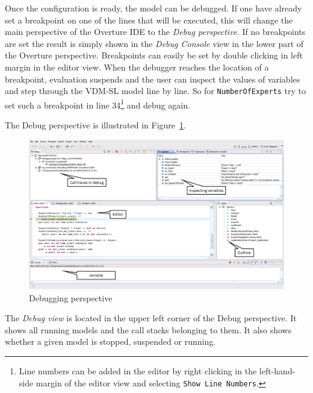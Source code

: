 Once the configuration is ready, the model can be debugged. If one
have already set a breakpoint on one of the lines that will be
executed, this will
change the main perspective of the Overture IDE to the \emph{Debug
  perspective}. If no breakpoints are set the result is simply shown
in the \emph{Debug Console} view in the lower part of the Overture
perspective. Breakpoints can easily be set by double clicking in
left margin in the editor view. When the debugger reaches the location
of a breakpoint, evaluation suspends and the user can inspect the
values of variables and step through the VDM-SL model line by line. So
for \texttt{NumberOfExperts} try to set such a breakpoint in line
34\footnote{Line numbers can be added in the editor by right clicking
  in the left-hand-side 
 margin of the editor view and selecting \texttt{Show Line Numbers}.}
and debug again.
 
The Debug perspective is illustrated in Figure~\ref{fig:DebuggingVDM}.
\begin{figure}[htp]
\begin{center}
  \includegraphics[width=4.5in]{figures/DebuggingVDM}
  \caption[Debugging perspective]{Debugging perspective}
  \label{fig:DebuggingVDM}
\end{center}
\end{figure}
The \emph{Debug view} is located in the upper left corner of the Debug
perspective. It shows all running models and the call stacks belonging
to them. It also shows whether a given model is stopped, suspended or
running. 


